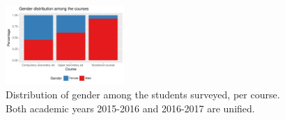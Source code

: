 \documentclass[journal,transmag]{IEEEtran}
\begin{document}
\begin{figure}
  \centering
  \includegraphics[width=0.4\textwidth]{img/gender_distribution.pdf}
  \caption{Distribution of gender among the students surveyed, per course. Both academic years 2015-2016 and 2016-2017 are unified.}
  \label{fig:alumni}
\end{figure}

%
\end{document}
